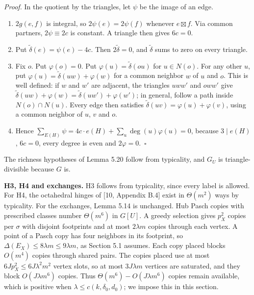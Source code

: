 \documentclass[english,11pt,a4paper]{article}
\providecommand{\tightlist}{\setlength{\itemsep}{0pt}\setlength{\parskip}{0pt}}
\begin{document}
\emph{Proof.} In the quotient by the triangles, let \(\psi\) be the image of an edge.

\begin{enumerate}
\def\labelenumi{\arabic{enumi}.}
\tightlist
\item
  \(2g(e,f)\) is integral, so \(2\psi(e)=2\psi(f)\) whenever \(e\boxtimes f\). Via common partners, \(2\psi\equiv2c\) is constant. A triangle then gives \(6c=0\).
\item
  Put \(\tilde\delta(e)=\psi(e)-4c\). Then \(2\tilde\delta=0\), and \(\tilde\delta\) sums to zero on every triangle.
\item
  Fix \(o\). Put \(\varphi(o)=0\). Put \(\varphi(u)=\tilde\delta(ou)\) for \(u\in N(o)\). For any other \(u\), put \(\varphi(u)=\tilde\delta(uw)+\varphi(w)\) for a common neighbor \(w\) of \(u\) and \(o\). This is well defined: if \(w\) and \(w'\) are adjacent, the triangles \(uww'\) and \(oww'\) give \(\tilde\delta(uw)+\varphi(w)=\tilde\delta(uw')+\varphi(w')\); in general, follow a path inside \(N(o)\cap N(u)\). Every edge then satisfies \(\tilde\delta(uv)=\varphi(u)+\varphi(v)\), using a common neighbor of \(u\), \(v\) and \(o\).
\item
  Hence \(\sum_{E(H)}\psi=4c\cdot e(H)+\sum_u\deg(u)\varphi(u)=0\), because \(3\mid e(H)\), \(6c=0\), every degree is even and \(2\varphi=0\).~\(\square\)
\end{enumerate}

The richness hypotheses of Lemma 5.20 follow from typicality, and \(G_U\) is triangle-divisible because \(G\) is.

\textbf{H3, H4 and exchanges.} H3 follows from typicality, since every label is allowed. For H4, the octahedral hinges of {[}10, Appendix B.4{]} exist in \(\Theta(m^2)\) ways by typicality. For the exchanges, Lemma 5.14 is unchanged. Hub Pasch copies with prescribed classes number \(\Theta(m^6)\) in \(G[U]\). A greedy selection gives \(p_X^2\) copies per \(\sigma\) with disjoint footprints and at most \(2\lambda m\) copies through each vertex. A point of a Pasch copy has four neighbors in its footprint, so \(\Delta(E_X)\le8\lambda m\le9\lambda m\), as Section 5.1 assumes. Each copy placed blocks \(O(m^4)\) copies through shared pairs. The copies placed use at most \(6Jp_X^2\le6J\lambda^2m^2\) vertex slots, so at most \(3J\lambda m\) vertices are saturated, and they block \(O(J\lambda m^6)\) copies. Thus \(\Theta(m^6)-O(J\lambda m^6)\) copies remain available, which is positive when \(\lambda\le c(k,\delta_0,d_0)\); we impose this in this section.
\end{document}
